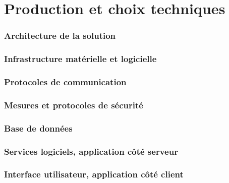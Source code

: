 \chapter{Production et choix techniques}


\subsection{Architecture de la solution}

\subsection{Infrastructure matérielle et logicielle}

\subsection{Protocoles de communication}

\subsection{Mesures et protocoles de sécurité}

\subsection{Base de données}

\subsection{Services logiciels, application côté serveur}

\subsection{Interface utilisateur, application côté client}
